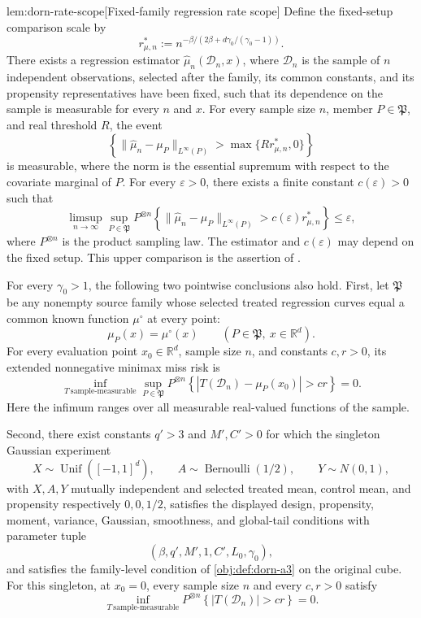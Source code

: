 \begin{propositionv}{lem:dorn-rate-scope}[Fixed-family regression rate scope]
Define the fixed-setup comparison scale by
\[
r^*_{\mu,n}
:=n^{-\beta/(2\beta+d\gamma_0/(\gamma_0-1))}.
\]
There exists a regression estimator \(\widehat\mu_n(\mathcal D_n,x)\), where \(\mathcal D_n\) is the sample of \(n\) independent observations, selected after the family, its common constants, and its propensity representatives have been fixed, such that its dependence on the sample is measurable for every \(n\) and \(x\). For every sample size \(n\), member \(P\in\mathfrak P\), and real threshold \(R\), the event
\[
\left\{
\|\widehat\mu_n-\mu_P\|_{L^\infty(P)}
>\max\{Rr^*_{\mu,n},0\}
\right\}
\]
is measurable, where the norm is the essential supremum with respect to the covariate marginal of \(P\). For every \(\varepsilon>0\), there exists a finite constant \(c(\varepsilon)>0\) such that
\[
\limsup_{n\to\infty}\sup_{P\in\mathfrak P}
P^{\otimes n}\!\left\{
\|\widehat\mu_n-\mu_P\|_{L^\infty(P)}
>c(\varepsilon)r^*_{\mu,n}
\right\}
\le\varepsilon,
\]
where \(P^{\otimes n}\) is the product sampling law. The estimator and \(c(\varepsilon)\) may depend on the fixed setup. This upper comparison is the assertion of \citet[Section 2, Assumptions 1--3, Theorem 1(ii)]{Dorn2026GlobalOverlap}.

For every \(\gamma_0>1\), the following two pointwise conclusions also hold. First, let \(\mathfrak P\) be any nonempty source family whose selected treated regression curves equal a common known function \(\mu^\circ\) at every point:
\[
\mu_P(x)=\mu^\circ(x)
\qquad(P\in\mathfrak P,\ x\in\mathbb R^d).
\]
For every evaluation point \(x_0\in\mathbb R^d\), sample size \(n\), and constants \(c,r>0\), its extended nonnegative minimax miss risk is
\[
\inf_{T\ \mathrm{sample\text{-}measurable}}
\sup_{P\in\mathfrak P}
P^{\otimes n}\!\left\{
|T(\mathcal D_n)-\mu_P(x_0)|>cr
\right\}
=0.
\]
Here the infimum ranges over all measurable real-valued functions of the sample.

Second, there exist constants \(q'>3\) and \(M',C'>0\) for which the singleton Gaussian experiment
\[
X\sim\operatorname{Unif}([-1,1]^d),\qquad
A\sim\operatorname{Bernoulli}(1/2),\qquad
Y\sim N(0,1),
\]
with \(X,A,Y\) mutually independent and selected treated mean, control mean, and propensity respectively \(0,0,1/2\), satisfies the displayed design, propensity, moment, variance, Gaussian, smoothness, and global-tail conditions with parameter tuple
\[
(\beta,q',M',1,C',L_0,\gamma_0),
\]
and satisfies the family-level condition of \cref{obj:def:dorn-a3} on the original cube. For this singleton, at \(x_0=0\), every sample size \(n\) and every \(c,r>0\) satisfy
\[
\inf_{T\ \mathrm{sample\text{-}measurable}}
P^{\otimes n}\!\left\{|T(\mathcal D_n)|>cr\right\}
=0.
\]
\end{propositionv}
